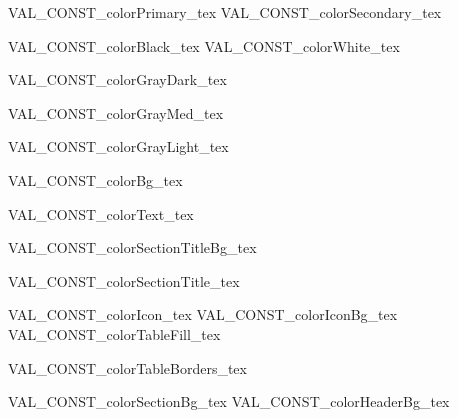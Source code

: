 


VAL_CONST_colorPrimary_tex
VAL_CONST_colorSecondary_tex

VAL_CONST_colorBlack_tex
VAL_CONST_colorWhite_tex

VAL_CONST_colorGrayDark_tex

VAL_CONST_colorGrayMed_tex

VAL_CONST_colorGrayLight_tex

VAL_CONST_colorBg_tex

VAL_CONST_colorText_tex

VAL_CONST_colorSectionTitleBg_tex

VAL_CONST_colorSectionTitle_tex


VAL_CONST_colorIcon_tex
VAL_CONST_colorIconBg_tex
VAL_CONST_colorTableFill_tex

\renewcommand{\setColorCell}{%
    \cellcolor{colorTableFill}%
}
VAL_CONST_colorTableBorders_tex



VAL_CONST_colorSectionBg_tex
VAL_CONST_colorHeaderBg_tex
